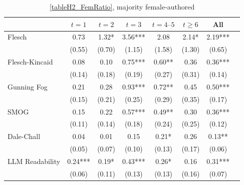 \begin{table}
    \footnotesize
    \centering
    \begin{threeparttable}
        \caption{\autoref{tableH2_FemRatio}, majority female-authored}
        \label{tableH2_Fem50}
        \begin{tabular}{p{3cm}S@{}S@{}S@{}S@{}S@{}S@{}S@{}}
            \toprule
            &{\(t=1\)}&{\(t=2\)}&{\(t=3\)}&{\(t=4\text{--}5\)}&{\(t\ge6\)}&{All}\\
            \midrule
            Flesch                        &        0.73   &        1.32*  &        3.56***&        2.08   &        2.14*  &        2.19***\\
                                          &      (0.55)   &      (0.70)   &      (1.15)   &      (1.58)   &      (1.30)   &      (0.65)   \\
            Flesch-Kincaid                &        0.08   &        0.10   &        0.75***&        0.60** &        0.36   &        0.36***\\
                                          &      (0.14)   &      (0.18)   &      (0.19)   &      (0.27)   &      (0.31)   &      (0.14)   \\
            Gunning Fog                   &        0.21   &        0.28   &        0.93***&        0.72** &        0.45   &        0.50***\\
                                          &      (0.15)   &      (0.21)   &      (0.25)   &      (0.29)   &      (0.35)   &      (0.17)   \\
            SMOG                          &        0.15   &        0.22   &        0.57***&        0.49** &        0.30   &        0.36***\\
                                          &      (0.11)   &      (0.14)   &      (0.18)   &      (0.24)   &      (0.25)   &      (0.12)   \\
            Dale-Chall                    &        0.04   &        0.01   &        0.15   &        0.21*  &        0.26   &        0.13** \\
                                          &      (0.05)   &      (0.07)   &      (0.10)   &      (0.13)   &      (0.17)   &      (0.06)   \\
            LLM Readability               &        0.24***&        0.19*  &        0.43***&        0.26*  &        0.16   &        0.31***\\
                                          &      (0.06)   &      (0.11)   &      (0.13)   &      (0.13)   &      (0.16)   &      (0.07)   \\

\end{tabular}
\end{threeparttable}
\end{table}
